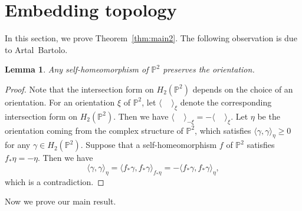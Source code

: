 \documentclass{math}
\theoremstyle{plain}
\newtheorem{lemma}[theorem]{Lemma}
\numberwithin{equation}{section}
\newcommand{\PP}{\mathord{\mathbb  P}}
\newcommand{\intf}[1]{\langle #1 \rangle}
\begin{document}
 \section{Embedding topology}\label{sec:embtop}
 In this section, we prove Theorem~\ref{thm:main2}.
 The following observation is due to Artal~Bartolo.
 \begin{lemma}\label{lem:AB}
 Any self-homeomorphism of $\PP^2$ preserves the orientation.
 \end{lemma}
  \begin{proof}
  Note that the intersection form on $H_2(\PP^2)$ 
  depends on the choice of an orientation.
  For an orientation $\xi$ of $\PP^2$, let $\intf{\phantom{i,i}}_{\xi}$ denote 
  the corresponding  intersection form on $H_2(\PP^2)$.
  Then we have $\intf{\phantom{i,i}}_{-\xi}=-\intf{\phantom{i,i}}_{\xi}$.
  Let $\eta$ be the orientation coming from the complex structure of $\PP^2$,
which satisfies $\intf{\gamma, \gamma}_{\eta}\ge 0$
  for any  $\gamma\in H_2(\PP^2)$.
Suppose that a self-homeomorphism $f$ of $\PP^2$ satisfies $f_*\eta = -\eta$.
Then we have 
  \[
  \intf{\gamma,\gamma}_{\eta}=  \intf{f_* \gamma,f_* \gamma}_{f_* \eta}=- \intf{f_* \gamma,f_* \gamma}_{\eta}, 
  \]
which is a contradiction.
  \end{proof}
  Now we prove our main result.
\end{document}
